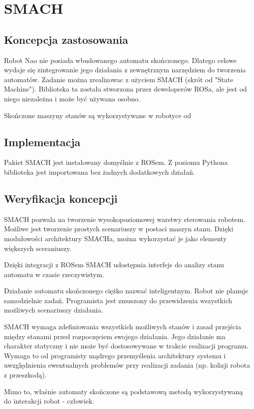 \section{SMACH}

\subsection{Koncepcja zastosowania}
Robot Nao nie posiada wbudowanego automatu skończonego. Dlatego celowe wydaje się zintegrowanie jego działania z zewnętrznym narzędziem do tworzenia automatów. 
Zadanie można zrealizowac z użyciem SMACH (skrót od "State Machine"). Biblioteka ta została stworzona przez deweloperów ROSa, ale jest od niego niezależna i może być używana osobno. 

Skończone maszyny stanów są wykorzystywane w robotyce od 

\subsection{Implementacja}
Pakiet SMACH jest instalowany domyślnie z ROSem. Z poziomu Pythona biblioteka jest importowana bez żadnych dodatkowych działań.

\subsection{Weryfikacja koncepcji}
SMACH pozwala na tworzenie wysokopoziomowej warstwy sterowania robotem. Możliwe jest tworzenie prostych scenariuszy w postaci maszyn stanu. Dzięki modułowości architektury SMACHa, można wykorzystać je jako elementy większych sceraniuszy. 

Dzięki integracji z ROSem SMACH udostępnia interfejs do analizy stanu automatu w czasie rzeczywistym. 

Działanie automatu skończonego ciężko nazwać inteligentnym. Robot nie planuje samodzielnie zadań. Programista jest zmuszony do przewidzenia wszystkich możliwych scenariuszy działania. 

SMACH wymaga zdefiniowania wszystkich możliwych stanów i zasad przejścia między stanami przed rozpoczęciem swojego działania. Jego działanie ma charakter statyczny i nie może być dostosowywane w trakcie realizacji programu. Wymaga to od programisty mądrego przemyślenia architektury systemu i uwzględnienia ewentualnych problemów przy realizacji zadania (np. kolizji robota z przeszkodą). 

Mimo to, właśnie automaty skończone są podstawową metodą wykorzystywaną do interakcji robot - człowiek.


